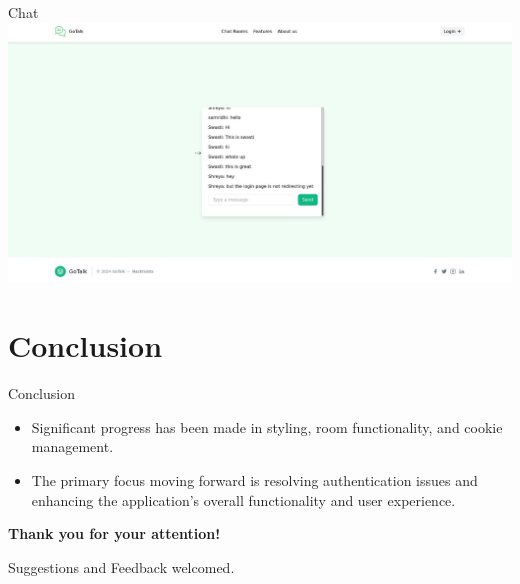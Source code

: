 \documentclass{beamer}
\begin{document}
\begin{frame}{Chat}
    \centering
    \includegraphics[width=0.9 \textwidth]{Pictures/room.jpg}
\end{frame}

\section{Conclusion}

\begin{frame}{Conclusion}
    \begin{itemize}
        \item Significant progress has been made in styling, room functionality, and cookie management. 
        \item The primary focus moving forward is resolving authentication issues and enhancing the application's overall functionality and user experience.
    \end{itemize}
    \vfill
    \begin{center}
        \textbf{Thank you for your attention!}
    \end{center}
    \begin{center}
        Suggestions and Feedback welcomed.
    \end{center}
\end{frame}
\end{document}

